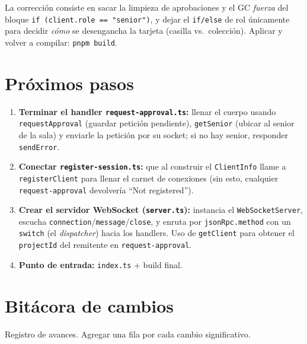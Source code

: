 \documentclass[11pt,a4paper]{article}
\begin{document}
La corrección consiste en sacar la limpieza de aprobaciones y el GC \emph{fuerza}
del bloque \texttt{if (client.role == "senior")}, y dejar el
\texttt{if/else} de rol únicamente para decidir \emph{cómo} se desengancha la
tarjeta (casilla vs.\ colección). Aplicar y volver a compilar:
\texttt{pnpm build}.

\section{Próximos pasos}

\begin{enumerate}
  \item \textbf{Terminar el handler \texttt{request-approval.ts}:} llenar el cuerpo
        usando \texttt{requestApproval} (guardar petición pendiente),
        \texttt{getSenior} (ubicar al senior de la sala) y enviarle la petición
        por su socket; si no hay senior, responder \texttt{sendError}.
  \item \textbf{Conectar \texttt{register-session.ts}:} que al construir el
        \texttt{ClientInfo} llame a \texttt{registerClient} para llenar el
        carnet de conexiones (sin esto, cualquier \texttt{request-approval}
        devolvería ``Not registered'').
  \item \textbf{Crear el servidor WebSocket (\texttt{server.ts}):} instancia el
        \texttt{WebSocketServer}, escucha \texttt{connection}/\texttt{message}/\texttt{close},
        y enruta por \texttt{jsonRpc.method} con un \texttt{switch} (el
        \emph{dispatcher}) hacia los handlers. Uso de \texttt{getClient} para
        obtener el \texttt{projectId} del remitente en \texttt{request-approval}.
  \item \textbf{Punto de entrada:} \texttt{index.ts} + build final.
\end{enumerate}

\section{Bitácora de cambios}

Registro de avances. Agregar una fila por cada cambio significativo.
\end{document}
